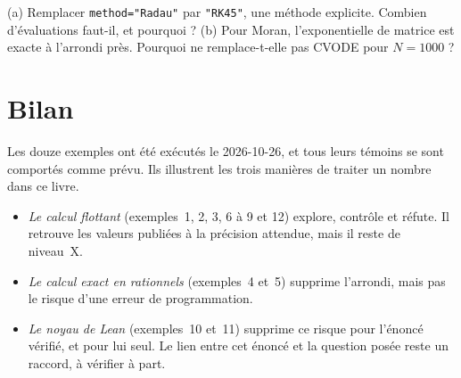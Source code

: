 \begin{exercise}[Exemple 12]\label{appF:exo12}
(a) Remplacer \texttt{method="Radau"} par \texttt{"RK45"}, une méthode explicite. Combien d'évaluations faut-il, et
pourquoi ? (b) Pour Moran, l'exponentielle de matrice est exacte à l'arrondi près. Pourquoi ne remplace-t-elle pas
CVODE pour $N=1000$ ?
\end{exercise}

\section{Bilan}\label{appF:bilan}

Les douze exemples ont été exécutés le 2026-10-26, et tous leurs témoins se sont comportés comme prévu. Ils illustrent
les trois manières de traiter un nombre dans ce livre.
\begin{itemize}
\item \emph{Le calcul flottant} (exemples~1, 2, 3, 6 à 9 et 12) explore, contrôle et réfute. Il retrouve les valeurs
publiées à la précision attendue, mais il reste de niveau~X.
\item \emph{Le calcul exact en rationnels} (exemples~4 et~5) supprime l'arrondi, mais pas le risque d'une erreur de
programmation.
\item \emph{Le noyau de Lean} (exemples~10 et~11) supprime ce risque pour l'énoncé vérifié, et pour lui seul. Le lien
entre cet énoncé et la question posée reste un raccord, à vérifier à part.
\end{itemize}
